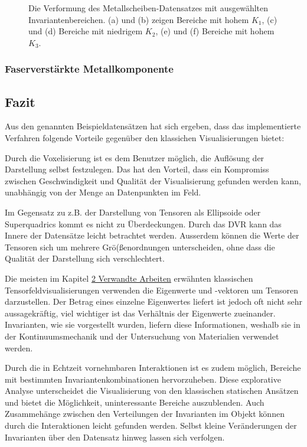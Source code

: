 \documentclass[a4paper,fontsize=12pt,toc=bib,halfparskip]{scrartcl}
\begin{document}
\begin{figure}
\begin{subfigure}{0.49\textwidth}
		\subcaption{}
		\label{}
	\end{subfigure}
	\caption{Die Verformung des Metallscheiben-Datensatzes mit ausgew\"ahlten Invariantenbereichen. (a) und (b) zeigen Bereiche mit hohem $K_1$, (c) und (d) Bereiche mit niedrigem $K_2$, (e) und (f) Bereiche mit hohem $K_3$.}
	\label{}
\end{figure}

\subsubsection{Faserverst\"arkte Metallkomponente}


\subsection{Fazit}
Aus den genannten Beispieldatens\"atzen hat sich ergeben, dass das implementierte Verfahren folgende Vorteile gegen\"uber den klassichen Visualisierungen bietet:

Durch die Voxelisierung ist es dem Benutzer m\"oglich, die Aufl\"osung der Darstellung selbst festzulegen. Das hat den Vorteil, dass ein Kompromiss zwischen Geschwindigkeit und Qualit\"at der Visualisierung gefunden werden kann, unabh\"angig von der Menge an Datenpunkten im Feld. 

Im Gegensatz zu z.B. der Darstellung von Tensoren als Ellipsoide oder Superquadrics kommt es nicht zu \"Uberdeckungen. Durch das DVR kann das Innere der Datens\"atze leicht betrachtet werden. Ausserdem k\"onnen die Werte der Tensoren sich um mehrere Gr\"o{(\ss}enordnungen unterscheiden, ohne dass die Qualit\"at der Darstellung sich verschlechtert.

Die meisten im Kapitel \hyperref[sec:Verwandte]{2 Verwandte Arbeiten} erw\"ahnten klassischen Tensorfeldvisualisierungen verwenden die Eigenwerte und -vektoren um Tensoren darzustellen. Der Betrag eines einzelne Eigenwertes liefert ist jedoch oft nicht sehr aussagekr\"aftig, viel wichtiger ist das Verh\"altnis der Eigenwerte zueinander. Invarianten, wie sie vorgestellt wurden, liefern diese Informationen, weshalb sie in der Kontinuumsmechanik und der Untersuchung von Materialien verwendet werden.

Durch die in Echtzeit vornehmbaren Interaktionen ist es zudem m\"oglich, Bereiche mit bestimmten Invariantenkombinationen hervorzuheben. Diese explorative Analyse unterscheidet die Visualisierung von den klassischen statischen Ans\"atzen und bietet die M\"oglichkeit, uninteressante Bereiche auszublenden. Auch Zusammeh\"ange zwischen den Verteilungen der Invarianten im Objekt k\"onnen durch die Interaktionen leicht gefunden werden. Selbst kleine Ver\"anderungen der Invarianten \"uber den Datensatz hinweg lassen sich verfolgen.
\end{document}
